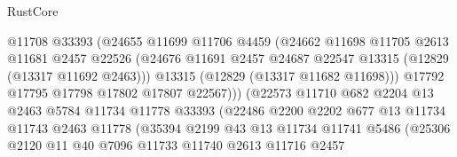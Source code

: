 \begin{lexlean}{RustCore}
\begin{coremodule}
                                @11708
                                @33393
                                (@24655
                                  @11699
                                  @11706
                                  @4459
                                  (@24662
                                    @11698
                                    @11705
                                    @2613
                                    @11681
                                    @2457
                                    @22526
                                    (@24676
                                      @11691
                                      @2457
                                      @24687
                                      @22547
                                      @13315
                                      (@12829 (@13317 @11692 @2463)))
                                    @13315
                                    (@12829 (@13317 @11682 @11698)))
                                  @17792
                                  @17795
                                  @17798
                                  @17802
                                  @17807
                                  @22567)))
                            (@22573
                              @11710
                              @682
                              @2204
                              @13
                              @2463
                              @5784
                              @11734
                              @11778
                              @33393
                              (@22486
                                @2200
                                @2202
                                @677
                                @13
                                @11734
                                @11743
                                @2463
                                @11778
                                (@35394
                                  @2199
                                  @43
                                  @13
                                  @11734
                                  @11741
                                  @5486
                                  (@25306
                                    @2120
                                    @11
                                    @40
                                    @7096
                                    @11733
                                    @11740
                                    @2613
                                    @11716
                                    @2457

\end{coremodule}
\end{lexlean}

